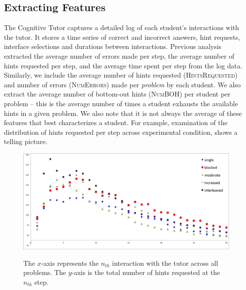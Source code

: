 \documentclass{edm_template}
\newcommand{\ftr}[1]{\textsc{#1}}
\begin{document}
\subsection{Extracting Features}
The Cognitive Tutor captures a detailed log of each student's interactions with the tutor. It stores a time series of correct and incorrect answers, hint requests, interface selections and durations between interactions. Previous analysis \cite{Rau2012} extracted the average number of errors made per step, the average number of hints requested per step, and the average time spent per step from the log data. Similarly, we include the average number of hints requested (\ftr{HintsRequested}) and number of errors (\ftr{NumErrors}) made per \emph{problem} by each student. We also extract the average number of bottom-out hints (\ftr{NumBOH}) per student per problem -- this is the average number of times a student exhausts the available hints in a given problem. We also note that it is not always the average of these features that best characterizes a student. For example, examination of the distribution of hints requested per step across experimental condition, shows a telling picture.
\begin{figure}[htbp]
\centering
\includegraphics[scale=.48]{hintsByStep2.png}\\
\caption{The $x$-axis represents the $n_{th}$ interaction with the tutor across all problems. The $y$-axis is the total number of hints requested at the $n_{th}$ step.  }
\label{fig:condition-graph}
\end{figure}
\end{document}
